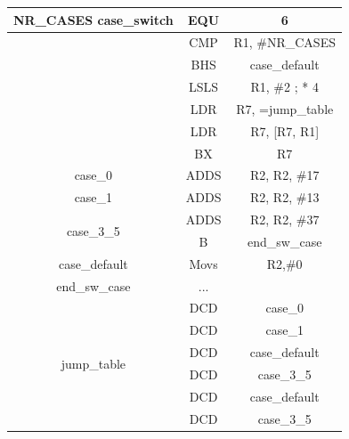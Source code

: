     \begin{center}
    \begin{tabular}{|c|c|c|}
    \hline
    \multirow[t]{7}{*}{NR\_CASES case\_switch} & EQU & 6 \\
    \hline
     & CMP & R1, \#NR\_CASES \\
    \hline
     & BHS & case\_default \\
    \hline
     & LSLS & R1, \#2 ; * 4 \\
    \hline
     & LDR & R7, =jump\_table \\
    \hline
     & LDR & R7, [R7, R1] \\
    \hline
     & BX & R7 \\
    \hline
    case\_0 & ADDS & R2, R2, \#17 \\
    \hline
    case\_1 & ADDS & R2, R2, \#13 \\
    \hline
    \multirow[t]{2}{*}{case\_3\_5} & ADDS & R2, R2, \#37 \\
    \hline
     & B & end\_sw\_case \\
    \hline
    case\_default & Movs & R2,\#0 \\
    \hline
    end\_sw\_case & ... &  \\
    \hline
    \multirow[t]{6}{*}{jump\_table} & DCD & case\_0 \\
    \hline
     & DCD & case\_1 \\
    \hline
     & DCD & case\_default \\
    \hline
     & DCD & case\_3\_5 \\
    \hline
     & DCD & case\_default \\
    \hline
     & DCD & case\_3\_5 \\
    \hline
    \end{tabular}
    \end{center}
    
